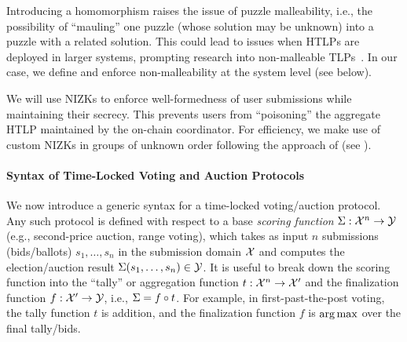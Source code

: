 Introducing a homomorphism raises the issue of puzzle malleability, i.e., the possibility of ``mauling'' one puzzle (whose solution may be unknown) into a puzzle with a related solution. This could lead to issues when HTLPs are deployed in larger systems, prompting research into non-malleable TLPs~\cite{TCC:FKPS21}. In our case, we define and enforce non-malleability at the system level (see below).

We will use NIZKs to enforce well-formedness of user submissions while maintaining their secrecy. This prevents users from ``poisoning'' the aggregate HTLP maintained by the on-chain coordinator. For efficiency, we make use of custom NIZKs in groups of unknown order following the approach of \cite{C:BonBunFis19} (see \cite{EPRINT:GSZB23}). 


\paragraph{Syntax of Time-Locked Voting and Auction Protocols}
We now introduce a generic syntax for a time-locked voting/auction protocol. Any such protocol is defined with respect to a base \emph{scoring function} $\Sigma: \mathcal{X}^n \to \mathcal{Y}$ (e.g., second-price auction, range voting), which takes as input $n$ submissions (bids/ballots) $s_1, \dots, s_n$ in the submission domain $\mathcal{X}$ and computes the election/auction result $\Sigma(s_1, \dots, s_n) \in \mathcal{Y}$. It is useful to break down the scoring function into the ``tally'' or aggregation function $t: \mathcal{X}^n \to \mathcal{X}'$ and the finalization function $f: \mathcal{X}' \to \mathcal{Y}$, i.e., $\Sigma = f \circ t$.
For example, in first-past-the-post voting, the tally function $t$ is addition, and the finalization function $f$ is $\operatorname*{arg\,max}$ over the final tally/bids.

